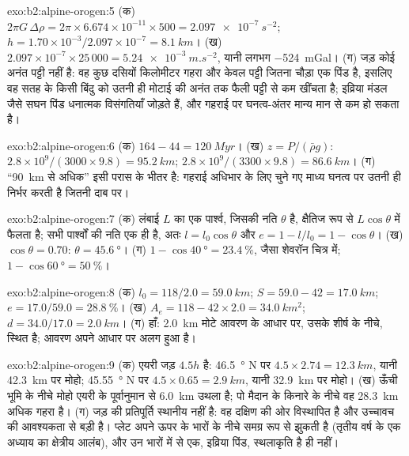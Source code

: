 \begin{solution}{exo:b2:alpine-orogen:5}
(क) $2\pi G\,\Delta\rho = 2\pi\times6.674\times10^{-11}\times500 =
\qty{2.097e-7}{s^{-2}}$; $h = 1.70\times10^{-3}/2.097\times10^{-7} = \qty{8.1}{km}$।
(ख) $2.097\times10^{-7}\times25\,000 = \qty{5.24e-3}{m.s^{-2}}$, यानी लगभग
\qty{-524}{mGal}। (ग) जड़ कोई अनंत पट्टी नहीं है: वह कुछ दसियों किलोमीटर
गहरा और केवल पट्टी जितना चौड़ा एक पिंड है, इसलिए वह सतह के किसी बिंदु को उतनी ही मोटाई की
अनंत तक फैली पट्टी से कम खींचता है; इव्रिया मंडल जैसे सघन पिंड
धनात्मक विसंगतियाँ जोड़ते हैं, और गहराई पर घनत्व-अंतर मान्य मान से कम हो सकता है।
\end{solution}

\begin{solution}{exo:b2:alpine-orogen:6}
(क) $164 - 44 = \qty{120}{Myr}$। (ख) $z = P/(\bar\rho g)$:
$2.8\times10^9/(3000\times9.8) = \qty{95.2}{km}$; $2.8\times10^9/(3300\times9.8) =
\qty{86.6}{km}$। (ग) ``\qty{90}{km} से अधिक'' इसी परास के भीतर है: गहराई अधिभार के लिए चुने गए
माध्य घनत्व पर उतनी ही निर्भर करती है जितनी दाब पर।
\end{solution}

\begin{solution}{exo:b2:alpine-orogen:7}
(क) लंबाई $L$ का एक पार्श्व, जिसकी नति $\theta$ है, क्षैतिज रूप से $L\cos\theta$ में फैलता है; सभी पार्श्वों
की नति एक ही है, अतः $l = l_0\cos\theta$ और $e = 1 - l/l_0 = 1 - \cos\theta$।
(ख) $\cos\theta = 0.70$: $\theta = \qty{45.6}{\degree}$। (ग) $1 - \cos\qty{40}{\degree} =
\qty{23.4}{\percent}$, जैसा शेवरॉन चित्र में; $1 - \cos\qty{60}{\degree}
= \qty{50}{\percent}$।
\end{solution}

\begin{solution}{exo:b2:alpine-orogen:8}
(क) $l_0 = 118/2.0 = \qty{59.0}{km}$; $S = 59.0 - 42 = \qty{17.0}{km}$; $e = 17.0/59.0 =
\qty{28.8}{\percent}$। (ख) $A_e = 118 - 42\times2.0 = \qty{34.0}{km^2}$; $d = 34.0/17.0 =
\qty{2.0}{km}$। (ग) हाँ:  \qty{2.0}{km} मोटे आवरण के आधार पर, उसके शीर्ष के नीचे,
स्थित है; आवरण अपने आधार पर अलग हुआ है।
\end{solution}

\begin{solution}{exo:b2:alpine-orogen:9}
(क) एयरी जड़ $4.5h$ है: \qty{46.5}{\degree} N पर $4.5\times2.74 = \qty{12.3}{km}$, यानी
\qty{42.3}{km} पर मोहो; \qty{45.55}{\degree} N पर $4.5\times0.65 = \qty{2.9}{km}$, यानी
\qty{32.9}{km} पर मोहो। (ख) ऊँची भूमि के नीचे मोहो एयरी के पूर्वानुमान से \qty{6.0}{km} उथला है;
पो मैदान के किनारे के नीचे वह \qty{28.3}{km} अधिक गहरा है। (ग) जड़ की
प्रतिपूर्ति स्थानीय नहीं है: वह दक्षिण की ओर विस्थापित है और उच्चावच की आवश्यकता से बड़ी है।
प्लेट अपने ऊपर के भारों के नीचे समग्र रूप से झुकती है (तृतीय वर्ष के एक अध्याय का क्षेत्रीय
आलंब), और उन भारों में से एक, इव्रिया पिंड, स्थलाकृति है ही नहीं।
\end{solution}

